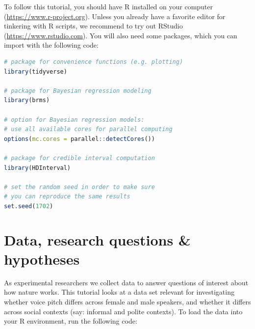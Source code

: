 \documentclass[nobib]{tufte-handout}
\begin{document}
To follow this tutorial, you should have R installed on your computer (\url{https://www.r-project.org}).
Unless you already have a favorite editor for tinkering with R scripts, we recommend to try out RStudio (\url{https://www.rstudio.com}).
You will also need some packages,
which you can import with the following code:

\bigskip

\begin{minipage}[]{\textwidth}
\begin{lstlisting}[language=R]
# package for convenience functions (e.g. plotting)
library(tidyverse)

# package for Bayesian regression modeling
library(brms)

# option for Bayesian regression models: 
# use all available cores for parallel computing
options(mc.cores = parallel::detectCores())

# package for credible interval computation
library(HDInterval)

# set the random seed in order to make sure 
# you can reproduce the same results
set.seed(1702)
\end{lstlisting}
\end{minipage}

\section{Data, research questions \& hypotheses}
\label{sec:data}

As experimental researchers we collect data to answer questions of interest about how nature works. This tutorial looks at a data set relevant for investigating whether voice pitch differs across female and male speakers, and whether it differs across social contexts (say: informal and polite contexts).
To load the data into your R environment, run the following code:
%
%

\medskip
\end{document}
